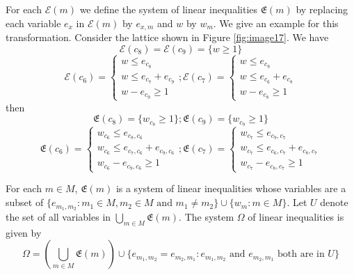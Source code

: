 \documentclass{article}
\theoremstyle{definition}
\newcommand\downn[2]{e_{#1,#2}}
\newcommand\downnn[2]{{#1}_{#2}}
\newcommand\down[1]{e_{#1}}
\newcommand\set[1]{\{ #1 \}}
\begin{document}
For each $\mathcal{E}(m)$ we define the system of linear inequalities $\mathfrak{E}(m)$ by replacing each variable $\down{x}$ in $\mathcal{E}(m)$ by $\downn{x}{m}$ and $w$ by $\downnn{w}{m}$. We give an example for this transformation. Consider the lattice shown in Figure \ref{fig:image17}. We have $$\mathcal{E}(c_8)=\mathcal{E}(c_9)=\set{w\geq 1}$$
$$
\mathcal{E}(c_6)=\left\{
\begin{array}{l}
w \leq \down{c_8}\\
w \leq \down{c_7}+\down{c_9}\\
w-\down{c_9}\geq 1
\end{array}
\right. ;
\mathcal{E}(c_7)=\left\{
\begin{array}{l}
w \leq \down{c_9}\\
w\leq \down{c_6}+\down{c_8}\\
w-\down{c_8}\geq 1
\end{array}
\right. 
$$
then 
$$
\mathfrak{E}(c_8)=\set{\downnn{w}{c_8}\geq 1};
\mathfrak{E}(c_9)=\set{\downnn{w}{c_9}\geq 1}
$$
$$
\mathfrak{E}(c_6)=\left\{\begin{array}{l}
\downnn{w}{c_6}\leq \downn{c_8}{c_6}\\
\downnn{w}{c_6}\leq \downn{c_7}{c_6}+\downn{c_9}{c_6}\\
\downnn{w}{c_6}-\downn{c_9}{c_6}\geq 1
\end{array}\right. ;
\mathfrak{E}(c_7)=\left\{\begin{array}{l}
\downnn{w}{c_7}\leq \downn{c_9}{c_7}\\
\downnn{w}{c_7}\leq \downn{c_6}{c_7}+\downn{c_8}{c_7}\\
\downnn{w}{c_7}-\downn{c_8}{c_7}\geq 1
\end{array}\right.
$$

For each $m\in M$, $\mathfrak{E}(m)$ is a system of linear inequalities whose variables are a subset of $\set{\downn{m_1}{m_2}: m_1\in M, m_2 \in M\text{ and } m_1 \neq m_2}\cup \set{\downnn{w}{m}: m\in M}$. Let $U$ denote the set of all variables in $\underset{m \in M}{\bigcup} \mathfrak{E}(m)$. The system $\Omega$ of linear inequalities is given by $$\Omega=\left(\underset{m \in M}{\bigcup}\mathfrak{E}(m)\right)\cup \set{\downn{m_1}{m_2}=\downn{m_2}{m_1}: \downn{m_1}{m_2}\text{ and }\downn{m_2}{m_1} \text{ both are in }U }$$ 
\end{document}
